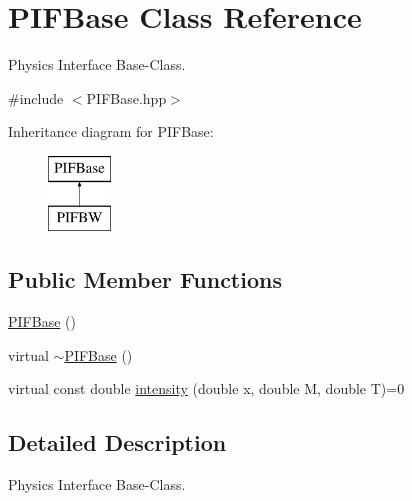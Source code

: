 \hypertarget{classPIFBase}{
\section{PIFBase Class Reference}
\label{d5/d3f/classPIFBase}
}


Physics Interface Base-\/Class.  




{\ttfamily \#include $<$PIFBase.hpp$>$}

Inheritance diagram for PIFBase:\begin{figure}[H]
\begin{center}
\leavevmode
\includegraphics[height=2.000000cm]{d5/d3f/classPIFBase}
\end{center}
\end{figure}
\subsection*{Public Member Functions}
\begin{DoxyCompactItemize}
\item 
\hyperlink{classPIFBase_aa435256425c756fa92b2008ca7381a47}{PIFBase} ()
\item 
virtual \hyperlink{classPIFBase_a0b598b33b36f0ecda10c9cafe3c8e083}{$\sim$PIFBase} ()
\item 
virtual const double \hyperlink{classPIFBase_a7e0628a7d23475f2471fb9b7262659cf}{intensity} (double x, double M, double T)=0
\end{DoxyCompactItemize}


\subsection{Detailed Description}
Physics Interface Base-\/Class. 

